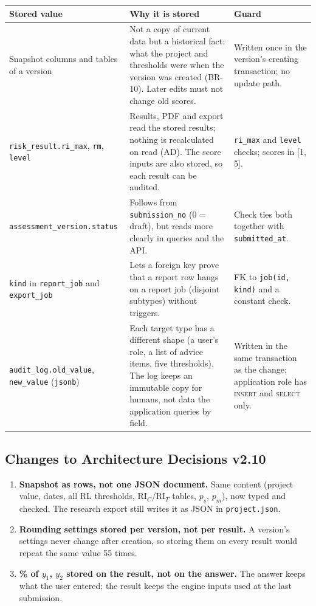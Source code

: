 \documentclass[11pt,a4paper]{article}
\newcommand{\RIC}{\mathrm{RI}_{C}}
\newcommand{\RIT}{\mathrm{RI}_{T}}
\newcommand{\tb}[1]{\texttt{#1}}
\begin{document}
{\small
\begin{longtable}{@{}R{4.6cm} R{7.4cm} R{4.1cm}@{}}
\toprule{}Stored value & Why it is stored & Guard \\ \midrule\endhead
Snapshot columns and tables of a version & Not a copy of current data but a historical fact: what the project and thresholds were when the version was created (BR-10). Later edits must not change old scores. & Written once in the version's creating transaction; no update path. \\
\tb{risk\_result.ri\_max}, \tb{rm}, \tb{level} & Results, PDF and export read the stored results; nothing is recalculated on read (AD). The score inputs are also stored, so each result can be audited. & \tb{ri\_max} and \tb{level} checks; scores in [1, 5]. \\
\tb{assessment\_version.status} & Follows from \tb{submission\_no} (0 = draft), but reads more clearly in queries and the API. & Check ties both together with \tb{submitted\_at}. \\
\tb{kind} in \tb{report\_job} and \tb{export\_job} & Lets a foreign key prove that a report row hangs on a report job (disjoint subtypes) without triggers. & FK to \tb{job(id, kind)} and a constant check. \\
\tb{audit\_log.old\_value}, \tb{new\_value} (\tb{jsonb}) & Each target type has a different shape (a user's role, a list of advice items, five thresholds). The log keeps an immutable copy for humans, not data the application queries by field. & Written in the same transaction as the change; application role has \textsc{insert} and \textsc{select} only. \\
\bottomrule
\end{longtable}}

\subsection{Changes to Architecture Decisions v2.10}\label{sec:changes}
\begin{enumerate}
\item \textbf{Snapshot as rows, not one JSON document.} Same content (project value, dates, all RL thresholds, $\RIC$/$\RIT$ tables, $p_s$, $p_m$), now typed and checked. The research export still writes it as JSON in \tb{project.json}.
\item \textbf{Rounding settings stored per version, not per result.} A version's settings never change after creation, so storing them on every result would repeat the same value 55 times.
\item \textbf{\% of $y_1$, $y_2$ stored on the result, not on the answer.} The answer keeps what the user entered; the result keeps the engine inputs used at the last submission.
\end{enumerate}
\end{document}
